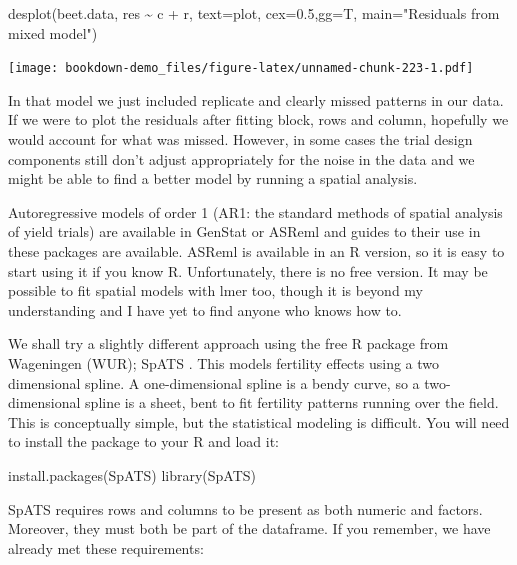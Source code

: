 \documentclass[
]{book}
\newenvironment{Shaded}{\begin{snugshade}}{\end{snugshade}}
\newcommand{\AttributeTok}[1]{\textcolor[rgb]{0.77,0.63,0.00}{#1}}
\newcommand{\FloatTok}[1]{\textcolor[rgb]{0.00,0.00,0.81}{#1}}
\newcommand{\FunctionTok}[1]{\textcolor[rgb]{0.00,0.00,0.00}{#1}}
\newcommand{\NormalTok}[1]{#1}
\newcommand{\SpecialCharTok}[1]{\textcolor[rgb]{0.00,0.00,0.00}{#1}}
\newcommand{\StringTok}[1]{\textcolor[rgb]{0.31,0.60,0.02}{#1}}
\begin{document}
\begin{Shaded}
\begin{Highlighting}[]
\FunctionTok{desplot}\NormalTok{(beet.data, res }\SpecialCharTok{\textasciitilde{}}\NormalTok{ c }\SpecialCharTok{+}\NormalTok{ r, }\AttributeTok{text=}\NormalTok{plot, }\AttributeTok{cex=}\FloatTok{0.5}\NormalTok{,}\AttributeTok{gg=}\NormalTok{T, }\AttributeTok{main=}\StringTok{"Residuals from mixed model"}\NormalTok{)}
\end{Highlighting}
\end{Shaded}

\texttt{[image: bookdown-demo\_files/figure-latex/unnamed-chunk-223-1.pdf]}

In that model we just included replicate and clearly missed patterns in our data. If we were to plot the residuals after fitting block, rows and column, hopefully we would account for what was missed. However, in some cases the trial design components still don't adjust appropriately for the noise in the data and we might be able to find a better model by running a spatial analysis.

Autoregressive models of order 1 (AR1: the standard methods of spatial analysis of yield trials) are available in GenStat or ASReml and guides to their use in these packages are available. ASReml is available in an R version, so it is easy to start using it if you know R. Unfortunately, there is no free version. It may be possible to fit spatial models with lmer too, though it is beyond my understanding and I have yet to find anyone who knows how to.

We shall try a slightly different approach using the free R package from Wageningen (WUR); SpATS \citep{SpATS2017}. This models fertility effects using a two dimensional spline. A one-dimensional spline is a bendy curve, so a two-dimensional spline is a sheet, bent to fit fertility patterns running over the field. This is conceptually simple, but the statistical modeling is difficult. You will need to install the package to your R and load it:

\begin{Shaded}
\begin{Highlighting}[]
\FunctionTok{install.packages}\NormalTok{(}\StringTok{\textquotesingle{}SpATS\textquotesingle{}}\NormalTok{)}
\FunctionTok{library}\NormalTok{(SpATS)}
\end{Highlighting}
\end{Shaded}

SpATS requires rows and columns to be present as both numeric and factors. Moreover, they must both be part of the dataframe. If you remember, we have already met these requirements:
\end{document}
